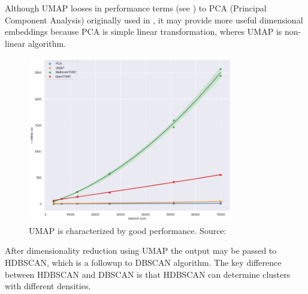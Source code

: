 Although UMAP looses in performance terms (see ) to PCA (Principal Component Analysis) originally used in \cite{Lach2022}, it may provide more useful dimensional embeddings because PCA is simple linear transformation, wheres UMAP is non-linear algorithm. 
\begin{figure}[htbp!] 
  \centering     
  \includegraphics[width=0.8\textwidth]{img/performance_umap.png} 
  \caption{UMAP is characterized by good performance. Source: \cite{umapPerformance}}
  \label{fig:umap_performance}
\end{figure}

After dimensionality reduction using UMAP the output may be passed to HDBSCAN, which is a followup to DBSCAN algorithm.
The key difference between HDBSCAN and DBSCAN is that HDBSCAN can determine clusters with different densities.